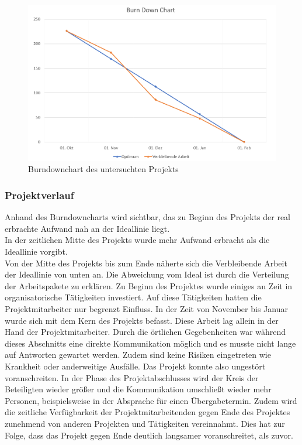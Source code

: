 \documentclass[ThesisDJ.tex]{subfiles}
\begin{document}
\begin{figure}
    \centering
    \includegraphics[width=\linewidth]{burnDownChart.png}
    \caption{Burndownchart des untersuchten Projekts}
    \label{fig:realburndown}
\end{figure}

\subsubsection{Projektverlauf}

Anhand des Burndowncharts wird sichtbar, das zu Beginn des Projekts der real erbrachte Aufwand nah an der Ideallinie liegt.\\
In der zeitlichen Mitte des Projekts wurde mehr Aufwand erbracht als die Ideallinie vorgibt.\\
Von der Mitte des Projekts bis zum Ende näherte sich die Verbleibende Arbeit der Ideallinie von unten an.
Die Abweichung vom Ideal ist durch die Verteilung der Arbeitspakete zu erklären. Zu Beginn des Projektes wurde einiges an Zeit in organisatorische Tätigkeiten investiert. Auf diese Tätigkeiten hatten die Projektmitarbeiter nur begrenzt Einfluss. In der Zeit von November bis Januar wurde sich mit dem Kern des Projekts befasst. Diese Arbeit lag allein in der Hand der Projektmitarbeiter. Durch die örtlichen Gegebenheiten war während dieses Abschnitts eine direkte Kommunikation möglich und es musste nicht lange auf Antworten gewartet werden. Zudem sind keine Risiken eingetreten wie Krankheit oder anderweitige Ausfälle. Das Projekt konnte also ungestört voranschreiten. 
In der Phase des Projektabschlusses wird der Kreis der Beteiligten wieder größer und die Kommunikation umschließt wieder mehr Personen, beispielsweise in der Absprache für einen Übergabetermin. Zudem wird die zeitliche Verfügbarkeit der Projektmitarbeitenden gegen Ende des Projektes zunehmend von anderen Projekten und Tätigkeiten vereinnahmt. Dies hat zur Folge, dass das Projekt gegen Ende deutlich langsamer voranschreitet, als zuvor.
\end{document}
